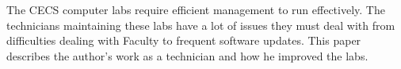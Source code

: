 \thispagestyle{empty}

The CECS computer labs require efficient management to run effectively. The technicians maintaining these labs have a lot of issues they must deal with from difficulties dealing with Faculty to frequent software updates. This paper describes the author's work as a technician and how he improved the labs. 
